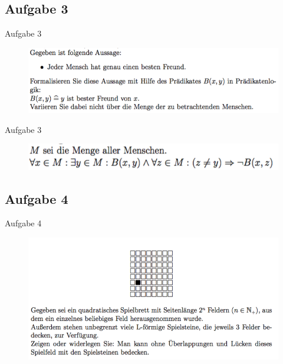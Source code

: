 \subsection{Aufgabe 3}
\begin{frame}{Aufgabe 3}
\begin{figure}[h!]
		\centering
		\includegraphics[width=\textwidth]{6.png} 
	\end{figure}     
\end{frame}

\begin{frame}{Aufgabe 3}
\begin{figure}[h!]
		\centering
		\includegraphics[width=\textwidth]{7.png} 
	\end{figure}    
\end{frame}

\subsection{Aufgabe 4}
\begin{frame}{Aufgabe 4}
\begin{figure}[h!]
		\centering
		\includegraphics[width=\textwidth]{8.png} 
	\end{figure}     
\end{frame}

